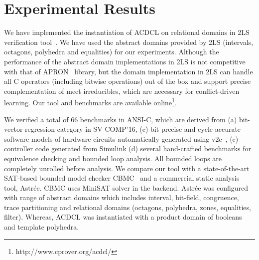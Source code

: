 \section{Experimental Results}
We have implemented the instantiation of ACDCL on relational domains
in 2LS verification tool~\cite{2ls}.  We have used the abstract domains
provided by 2LS (intervals, octagons, polyhedra and equalities) for our
experiments. Although the performance of the abstract domain implementations 
in 2LS is not competitive with that of APRON~\cite{apron} library, but 
the domain implementation in 2LS can handle all C operators 
(including bitwise operations) out of the box and support precise
complementation of meet irreducibles, which are necessary for conflict-driven 
learning. Our tool and benchmarks are available online\footnote{http://www.cprover.org/acdcl/}.

We verified a total of 66 benchmarks in ANSI-C, which are derived from 
(a) bit-vector regression category in SV-COMP'16, (c) bit-precise and 
cycle accurate software models of hardware circuits automatically 
generated using v2c~\cite{mtk2016}, (c) controller code generated 
from Simulink (d) several hand-crafted benchmarks for equivalence 
checking and bounded loop analysis.  All bounded loops are completely 
unrolled before analysis.  We compare our tool with a state-of-the-art 
SAT-based bounded model checker CBMC~\cite{cbmc} and a commercial 
static analysis tool, Astr{\'e}e.  CBMC uses MiniSAT solver in the backend.  
Astr{\'e}e was configured with range of abstract domains which includes 
interval, bit-field, congruence, trace partitioning and relational 
domains (octagons, polyhedra, zones, equalities, filter).  Whereas, 
ACDCL was instantiated with a product domain of booleans and template 
polyhedra.   
%
